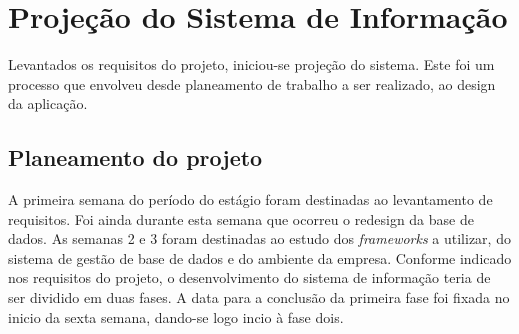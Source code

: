 \chapter{Projeção do Sistema de Informação} 
\label{cap:4}
Levantados os requisitos do projeto, iniciou-se projeção do sistema. Este foi um processo que envolveu desde planeamento de trabalho a ser realizado, ao design da aplicação.

\section{Planeamento do projeto}
A primeira semana do período do estágio foram destinadas ao levantamento de requisitos. Foi ainda durante esta semana que ocorreu o redesign da base de dados.
As semanas 2 e 3 foram destinadas ao estudo dos \textit{frameworks} a utilizar, do sistema de gestão de base de dados e do ambiente da empresa.
Conforme indicado nos requisitos do projeto, o desenvolvimento do sistema de informação teria de ser dividido em duas fases. A data para a conclusão da primeira fase foi fixada no inicio da sexta semana, dando-se logo incio à fase dois.

